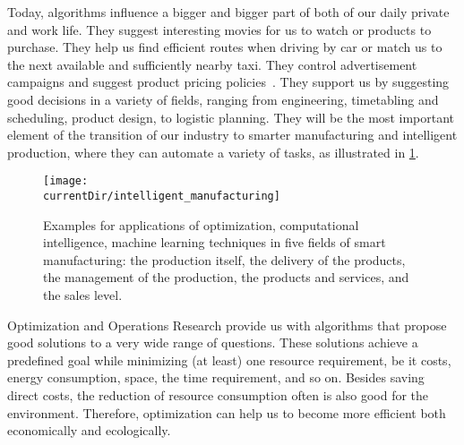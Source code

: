 \hsection{}%
%
%
Today, algorithms influence a bigger and bigger part of both of our daily private and work life.
They suggest interesting movies for us to watch or products to purchase.
They help us find efficient routes when driving by car or match us to the next available and sufficiently nearby taxi.
They control advertisement campaigns and suggest product pricing policies~\cite{MAM2021TROAIRWAFRAMG}.
They support us by suggesting good decisions in a variety of fields, ranging from engineering, timetabling and scheduling, product design, to logistic planning.
They will be the most important element of the transition of our industry to smarter manufacturing and intelligent production, where they can automate a variety of tasks, as illustrated in \cref{fig:intelligent_manufacturing}.

\begin{figure}%
\centering%
\texttt{[image: \\currentDir/intelligent\_manufacturing]}%
\caption{%
Examples for applications of optimization, computational intelligence, machine learning techniques in five fields of smart manufacturing: the production itself, the delivery of the products, the management of the production, the products and services, and the sales level.}%
\label{fig:intelligent_manufacturing}%
\end{figure}%

Optimization and Operations Research provide us with algorithms that propose good solutions to a very wide range of questions.
These solutions achieve a predefined goal while minimizing (at least) one resource requirement, be it costs, energy consumption, space, the time requirement, and so on.
Besides saving direct costs, the reduction of resource consumption often is also good for the environment.
Therefore, optimization can help us to become more efficient both economically and ecologically.

